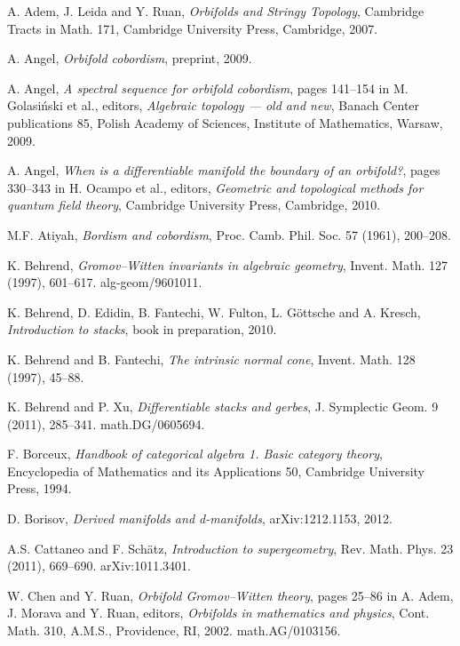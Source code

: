 \documentclass{article}
\begin{document}
\begin{thebibliography}{99}

 A. Adem, J. Leida and Y. Ruan, {\it Orbifolds and
Stringy Topology}, Cambridge Tracts in Math. 171, Cambridge
University Press, Cambridge, 2007.

 A. Angel, {\it Orbifold cobordism}, preprint, 2009.

 A. Angel, {\it A spectral sequence for orbifold
cobordism}, pages 141--154 in M. Golasi\'nski et al., editors, {\it
Algebraic topology --- old and new}, Banach Center publications 85,
Polish Academy of Sciences, Institute of Mathematics, Warsaw, 2009.

 A. Angel, {\it When is a differentiable manifold
the boundary of an orbifold?}, pages 330--343 in H. Ocampo et al.,
editors, {\it Geometric and topological methods for quantum field
theory}, Cambridge University Press, Cambridge, 2010.

 M.F. Atiyah, {\it Bordism and cobordism}, Proc. Camb.
Phil. Soc. 57 (1961), 200--208.

 K. Behrend, {\it Gromov--Witten invariants in algebraic
geometry}, Invent. Math. 127 (1997), 601--617. alg-geom/9601011.

 K. Behrend, D. Edidin, B. Fantechi, W. Fulton, L.
G\"ottsche and A. Kresch, {\it Introduction to stacks}, book in
preparation, 2010.

 K. Behrend and B. Fantechi, {\it The intrinsic normal
cone}, Invent. Math. 128 (1997), 45--88.

 K. Behrend and P. Xu, {\it Differentiable stacks and
gerbes}, J. Symplectic Geom. 9 (2011), 285--341. math.DG/0605694.

 F. Borceux, {\it Handbook of categorical algebra 1.
Basic category theory}, Encyclopedia of Mathematics and its
Applications 50, Cambridge University Press, 1994.

 D. Borisov, {\it Derived manifolds and d-manifolds},
arXiv:1212.1153, 2012.

 A.S. Cattaneo and F. Sch\"atz, {\it Introduction to
supergeometry}, Rev. Math. Phys. 23 (2011), 669--690.
arXiv:1011.3401.

 W. Chen and Y. Ruan, {\it Orbifold Gromov--Witten
theory}, pages 25--86 in A. Adem, J. Morava and Y. Ruan, editors,
{\it Orbifolds in mathematics and physics}, Cont. Math. 310, A.M.S.,
Providence, RI, 2002. math.AG/0103156.


\end{thebibliography}
\end{document}
